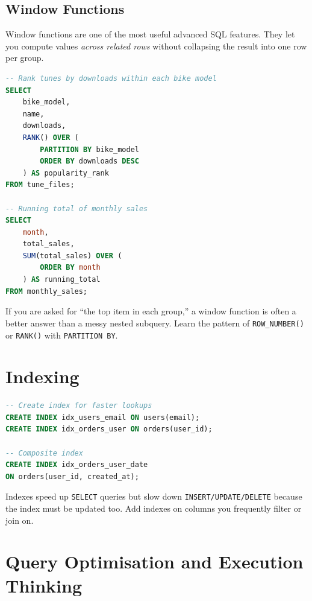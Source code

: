 \documentclass[12pt, a4paper, oneside]{book}
\begin{document}
\subsection{Window Functions}

Window functions are one of the most useful advanced SQL features. They let you compute values \emph{across related rows} without collapsing the result into one row per group.

\begin{lstlisting}[language=SQL, caption={Window function examples}]
-- Rank tunes by downloads within each bike model
SELECT
    bike_model,
    name,
    downloads,
    RANK() OVER (
        PARTITION BY bike_model
        ORDER BY downloads DESC
    ) AS popularity_rank
FROM tune_files;

-- Running total of monthly sales
SELECT
    month,
    total_sales,
    SUM(total_sales) OVER (
        ORDER BY month
    ) AS running_total
FROM monthly_sales;
\end{lstlisting}

\begin{examtipbox}
If you are asked for ``the top item in each group,'' a window function is often a better answer than a messy nested subquery. Learn the pattern of \texttt{ROW\_NUMBER()} or \texttt{RANK()} with \texttt{PARTITION BY}.
\end{examtipbox}

\section{Indexing}

\begin{lstlisting}[language=SQL, caption={Indexes}]
-- Create index for faster lookups
CREATE INDEX idx_users_email ON users(email);
CREATE INDEX idx_orders_user ON orders(user_id);

-- Composite index
CREATE INDEX idx_orders_user_date
ON orders(user_id, created_at);
\end{lstlisting}

\begin{notebox}
Indexes speed up \texttt{SELECT} queries but slow down \texttt{INSERT/UPDATE/DELETE} because the index must be updated too. Add indexes on columns you frequently filter or join on.
\end{notebox}

\section{Query Optimisation and Execution Thinking}
\end{document}
